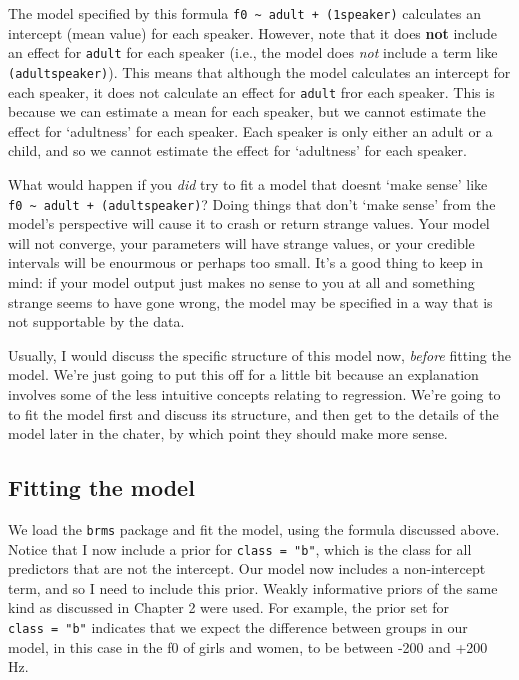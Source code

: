 \documentclass[
]{book}
\begin{document}
The model specified by this formula \texttt{f0\ \textasciitilde{}\ adult\ +\ (1\textbar{}speaker)} calculates an intercept (mean value) for each speaker. However, note that it does \textbf{not} include an effect for \texttt{adult} for each speaker (i.e., the model does \emph{not} include a term like \texttt{(adult\textbar{}speaker)}). This means that although the model calculates an intercept for each speaker, it does not calculate an effect for \texttt{adult} fror each speaker. This is because we can estimate a mean for each speaker, but we cannot estimate the effect for `adultness' for each speaker. Each speaker is only either an adult or a child, and so we cannot estimate the effect for `adultness' for each speaker.

What would happen if you \emph{did} try to fit a model that doesnt `make sense' like \texttt{f0\ \textasciitilde{}\ adult\ +\ (adult\textbar{}speaker)}? Doing things that don't `make sense' from the model's perspective will cause it to crash or return strange values. Your model will not converge, your parameters will have strange values, or your credible intervals will be enourmous or perhaps too small. It's a good thing to keep in mind: if your model output just makes no sense to you at all and something strange seems to have gone wrong, the model may be specified in a way that is not supportable by the data.

Usually, I would discuss the specific structure of this model now, \emph{before} fitting the model. We're just going to put this off for a little bit because an explanation involves some of the less intuitive concepts relating to regression. We're going to to fit the model first and discuss its structure, and then get to the details of the model later in the chater, by which point they should make more sense.

\hypertarget{fitting-the-model-1}{%
\subsection{Fitting the model}\label{fitting-the-model-1}}

We load the \texttt{brms} package and fit the model, using the formula discussed above. Notice that I now include a prior for \texttt{class\ =\ "b"}, which is the class for all predictors that are not the intercept. Our model now includes a non-intercept term, and so I need to include this prior. Weakly informative priors of the same kind as discussed in Chapter 2 were used. For example, the prior set for \texttt{class\ =\ "b"} indicates that we expect the difference between groups in our model, in this case in the f0 of girls and women, to be between -200 and +200 Hz.
\end{document}
